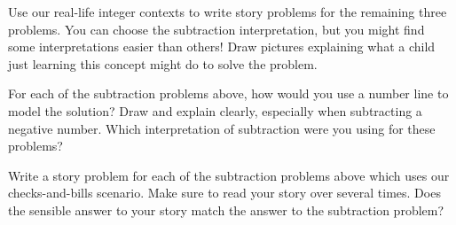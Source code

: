 \documentclass{ximera}
\begin{document}
\begin{question}
Use our real-life integer contexts to write story problems for the remaining three problems.  You can choose the subtraction interpretation, but you might find some interpretations easier than others!  Draw pictures explaining what a child just learning this concept might do to solve the problem.

\end{question}

\begin{question}
For each of the subtraction problems above, how would you use a number line to model the solution?  Draw and explain clearly, especially when subtracting a negative number.  Which interpretation of subtraction were you using for these problems?
\end{question}

\begin{question}
Write a story problem for each of the subtraction problems above which uses our checks-and-bills scenario.  Make sure to read your story over several times.  Does the sensible answer to your story match the answer to the subtraction problem?
\end{question}
\end{document}
